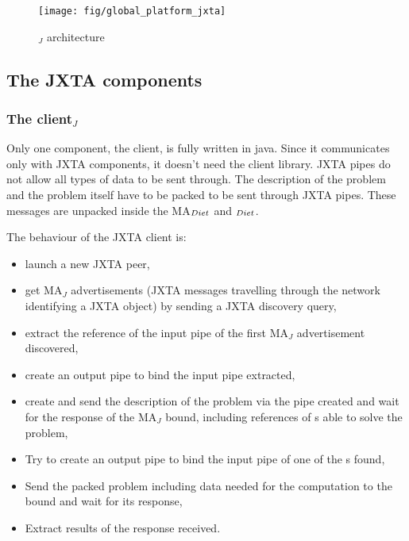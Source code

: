 \begin{figure}[htb]
 \begin{center}
   \texttt{[image: fig/global\_platform\_jxta]}
  \caption{\diet$_{J}$ architecture}
 \end{center}
\end{figure}

\subsection{The JXTA components}
\label{ssec:jxtacomponents}

\subsubsection{The client$_{J}$}
\label{sssec:jxtaclient}

Only one component, the client, is fully written in java. Since it
communicates only with JXTA components, it doesn't need the \diet
client library.  JXTA pipes do not allow all types of data to be sent
through. The description of the problem and the problem itself have to
be packed to be sent through JXTA pipes. These messages are unpacked
inside the MA$_{{\sc Diet}}$ and \sed$_{{\sc Diet}}$.

The behaviour of the JXTA client is:

\begin {itemize}
\item{launch a new JXTA peer,}
\item{get MA$_{J}$ advertisements (JXTA messages travelling through
    the network identifying a JXTA object) by sending a JXTA discovery
    query,}
\item{extract the reference of the input pipe of the first
    MA$_{J}$ advertisement discovered,}
\item{create an output pipe to bind the input pipe extracted,}
\item{create and send the description of the problem via the pipe
    created and wait for the response of the MA$_{J}$ bound, including
    references of {\sed}s able to solve the problem,}
\item{Try to create an output pipe to bind the input pipe of one of
    the {\sed}s found,}
\item{Send the packed problem including data needed for the
    computation to the \sed bound and wait for its response,}
\item{Extract results of the response received.}
\end{itemize}

